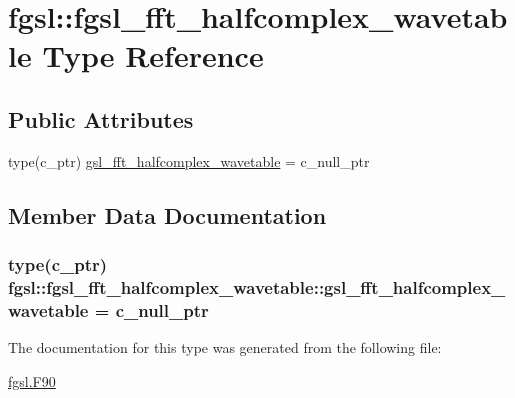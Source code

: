 \hypertarget{structfgsl_1_1fgsl__fft__halfcomplex__wavetable}{}\section{fgsl\+:\+:fgsl\+\_\+fft\+\_\+halfcomplex\+\_\+wavetable Type Reference}
\label{structfgsl_1_1fgsl__fft__halfcomplex__wavetable}
\subsection*{Public Attributes}
\begin{DoxyCompactItemize}
\item 
type(c\+\_\+ptr) \hyperlink{structfgsl_1_1fgsl__fft__halfcomplex__wavetable_add900077adc0ba713682ec60b81d3c5a}{gsl\+\_\+fft\+\_\+halfcomplex\+\_\+wavetable} = c\+\_\+null\+\_\+ptr
\end{DoxyCompactItemize}


\subsection{Member Data Documentation}
\hypertarget{structfgsl_1_1fgsl__fft__halfcomplex__wavetable_add900077adc0ba713682ec60b81d3c5a}{}
\subsubsection[{gsl\+\_\+fft\+\_\+halfcomplex\+\_\+wavetable}]{\setlength{\rightskip}{0pt plus 5cm}type(c\+\_\+ptr) fgsl\+::fgsl\+\_\+fft\+\_\+halfcomplex\+\_\+wavetable\+::gsl\+\_\+fft\+\_\+halfcomplex\+\_\+wavetable = c\+\_\+null\+\_\+ptr}\label{structfgsl_1_1fgsl__fft__halfcomplex__wavetable_add900077adc0ba713682ec60b81d3c5a}


The documentation for this type was generated from the following file\+:\begin{DoxyCompactItemize}
\item 
\hyperlink{fgsl_8F90}{fgsl.\+F90}\end{DoxyCompactItemize}
